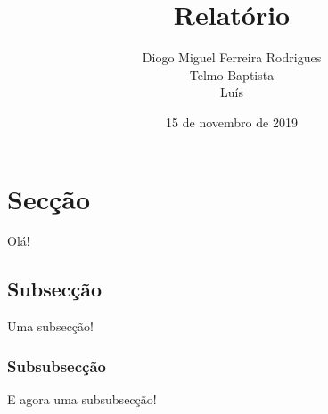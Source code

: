 \documentclass{article}
\title{Relatório}
\author{Diogo Miguel Ferreira Rodrigues\\Telmo Baptista\\Luís}
\date{15 de novembro de 2019}
\theoremstyle{remark}
\begin{document}
\maketitle
\tableofcontents
\section{Secção}
Olá!
\subsection{Subsecção}
Uma subsecção!
\subsubsection{Subsubsecção}
E agora uma subsubsecção!
\end{document}

